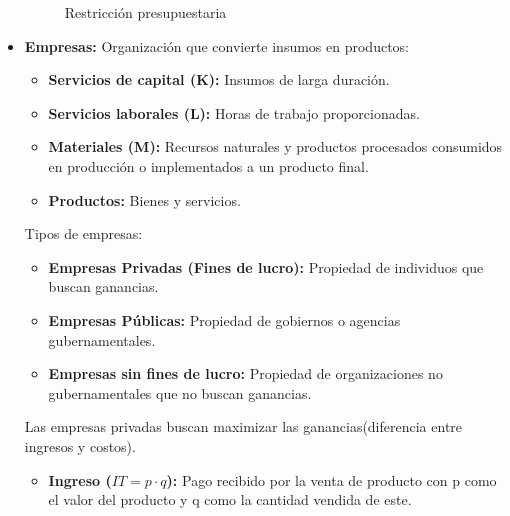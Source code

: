 \documentclass{templateNote}
\begin{document}
\begin{itemize}
\begin{figure}[H]
        \caption{Restricción presupuestaria}

    \end{figure}

    \newpage
    \item \textbf{Empresas:} Organización que convierte insumos en productos:
    \begin{itemize}
        \item \textbf{Servicios de capital (K):} Insumos de larga duración.
        
        \item \textbf{Servicios laborales (L):} Horas de trabajo proporcionadas.
        
        \item \textbf{Materiales (M):} Recursos naturales y productos procesados consumidos en producción o
        implementados a un producto final.
        
        \item \textbf{Productos:} Bienes y servicios.
    \end{itemize}

    Tipos de empresas:
    \begin{itemize}
        \item \textbf{Empresas Privadas (Fines de lucro):} Propiedad de individuos que buscan ganancias.
        
        \item \textbf{Empresas Públicas:} Propiedad de gobiernos o agencias gubernamentales.
        
        \item \textbf{Empresas sin fines de lucro:} Propiedad de organizaciones no gubernamentales que no
        buscan ganancias.        
    \end{itemize}

    Las empresas privadas buscan maximizar las ganancias(diferencia entre ingresos y costos).
    \begin{itemize}
        \item \textbf{Ingreso ($IT = p \cdot q$):} Pago recibido por la venta de producto con p como el valor del
        producto y q como la cantidad vendida de este.
        

\end{itemize}
\end{itemize}
\end{document}
